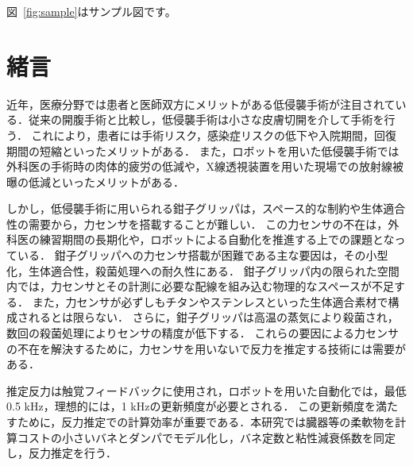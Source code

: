 \documentclass[a4paper]{jarticle}
\begin{document}
図~\ref{fig:sample}はサンプル図です。
\fi

\section{緒言}
近年，医療分野では患者と医師双方にメリットがある低侵襲手術が注目されている\cite{MIS_ref1}．従来の開腹手術と比較し，低侵襲手術は小さな皮膚切開を介して手術を行う．
これにより，患者には手術リスク，感染症リスクの低下\cite{MIS_ref2}や入院期間\cite{MIS_ref3}，回復期間の短縮\cite{MIS_ref4}といったメリットがある．
また，ロボットを用いた低侵襲手術では外科医の手術時の肉体的疲労の低減や，X線透視装置を用いた現場での放射線被曝の低減といったメリットがある\cite{MIS_ref5}．

しかし，低侵襲手術に用いられる鉗子グリッパは，スペース的な制約\cite{MIS_ref1}や生体適合性の需要\cite{MIS_ref6}から，力センサを搭載することが難しい．
この力センサの不在は，外科医の練習期間の長期化\cite{MIS_learning_time}や，ロボットによる自動化を推進する上での課題となっている\cite{RMIS}．
鉗子グリッパへの力センサ搭載が困難である主な要因は，その小型化，生体適合性，殺菌処理への耐久性にある\cite{MIS_ref7}．
鉗子グリッパ内の限られた空間内では，力センサとその計測に必要な配線を組み込む物理的なスペースが不足する\cite{MIS_ref1}．
また，力センサが必ずしもチタンやステンレスといった生体適合素材で構成されるとは限らない\cite{MIS_ref6}．
さらに，鉗子グリッパは高温の蒸気により殺菌され，数回の殺菌処理によりセンサの精度が低下する\cite{MIS_ref7}．
これらの要因による力センサの不在を解決するために，力センサを用いないで反力を推定する技術には需要がある．

 推定反力は触覚フィードバックに使用され，ロボットを用いた自動化では，最低0.5 kHz\cite{fps_ref1}，理想的には，1 kHzの更新頻度が必要とされる\cite{fps_ref2}．
この更新頻度を満たすために，反力推定での計算効率が重要である．本研究では臓器等の柔軟物を計算コストの小さいバネとダンパでモデル化し，バネ定数と粘性減衰係数を同定し，反力推定を行う．

\end{document}
